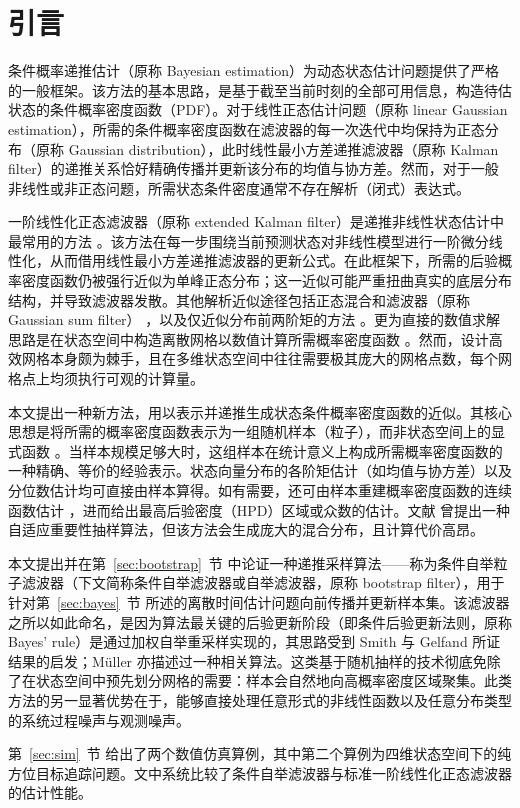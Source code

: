 \section{引言}\label{sec:intro}

条件概率递推估计（原称 Bayesian estimation）为动态状态估计问题提供了严格的一般框架。该方法的基本思路，是基于截至当前时刻的全部可用信息，构造待估状态的条件概率密度函数（PDF）。对于线性正态估计问题（原称 linear Gaussian estimation），所需的条件概率密度函数在滤波器的每一次迭代中均保持为正态分布（原称 Gaussian distribution），此时线性最小方差递推滤波器（原称 Kalman filter）的递推关系恰好精确传播并更新该分布的均值与协方差。然而，对于一般非线性或非正态问题，所需状态条件密度通常不存在解析（闭式）表达式。

一阶线性化正态滤波器（原称 extended Kalman filter）是递推非线性状态估计中最常用的方法 \cite{r01}。该方法在每一步围绕当前预测状态对非线性模型进行一阶微分线性化，从而借用线性最小方差递推滤波器的更新公式。在此框架下，所需的后验概率密度函数仍被强行近似为单峰正态分布；这一近似可能严重扭曲真实的底层分布结构，并导致滤波器发散。其他解析近似途径包括正态混合和滤波器（原称 Gaussian sum filter） \cite{r02}，以及仅近似分布前两阶矩的方法 \cite{r03,r04}。更为直接的数值求解思路是在状态空间中构造离散网格以数值计算所需概率密度函数 \cite{r05,r06,r07,r08,r09}。然而，设计高效网格本身颇为棘手，且在多维状态空间中往往需要极其庞大的网格点数，每个网格点上均须执行可观的计算量。

本文提出一种新方法，用以表示并递推生成状态条件概率密度函数的近似。其核心思想是将所需的概率密度函数表示为一组随机样本（粒子），而非状态空间上的显式函数 \cite{r10,r11,r12}。当样本规模足够大时，这组样本在统计意义上构成所需概率密度函数的一种精确、等价的经验表示。状态向量分布的各阶矩估计（如均值与协方差）以及分位数估计均可直接由样本算得。如有需要，还可由样本重建概率密度函数的连续函数估计 \cite{r13}，进而给出最高后验密度（HPD）区域或众数的估计。文献 \cite{r11} 曾提出一种自适应重要性抽样算法，但该方法会生成庞大的混合分布，且计算代价高昂。

本文提出并在第~\ref{sec:bootstrap}~节 中论证一种递推采样算法——称为条件自举粒子滤波器（下文简称条件自举滤波器或自举滤波器，原称 bootstrap filter），用于针对第~\ref{sec:bayes}~节 所述的离散时间估计问题向前传播并更新样本集。该滤波器之所以如此命名，是因为算法最关键的后验更新阶段（即条件后验更新法则，原称 Bayes' rule）是通过加权自举重采样实现的，其思路受到 Smith 与 Gelfand \cite{r14} 所证结果的启发；Müller \cite{r12} 亦描述过一种相关算法。这类基于随机抽样的技术彻底免除了在状态空间中预先划分网格的需要：样本会自然地向高概率密度区域聚集。此类方法的另一显著优势在于，能够直接处理任意形式的非线性函数以及任意分布类型的系统过程噪声与观测噪声。

第~\ref{sec:sim}~节 给出了两个数值仿真算例，其中第二个算例为四维状态空间下的纯方位目标追踪问题。文中系统比较了条件自举滤波器与标准一阶线性化正态滤波器的估计性能。
